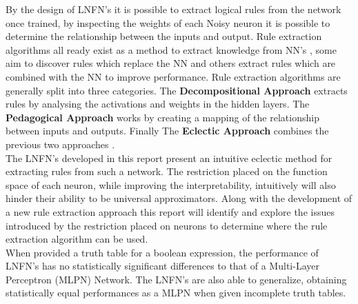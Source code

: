 By the design of LNFN's it is possible to extract logical rules from the network once trained, by inspecting the weights of each Noisy neuron it is possible to determine the relationship between the inputs and output. Rule extraction algorithms all ready exist as a method to extract knowledge from NN's \cite{andrews1995survey}, some aim to discover rules which replace the NN and others extract rules which are combined with the NN to improve performance. Rule extraction algorithms are generally split into three categories. The \textbf{Decompositional Approach} extracts rules by analysing the activations and weights in the hidden layers. The \textbf{Pedagogical Approach} works by creating a mapping of the relationship between inputs and outputs. Finally The \textbf{Eclectic Approach} combines the previous two approaches \cite{andrews1995survey}.\\

The LNFN's developed in this report present an intuitive eclectic method for extracting rules from such a network. The restriction placed on the function space of each neuron, while improving the interpretability, intuitively will also hinder their ability to be universal approximators. Along with the development of a new rule extraction approach this report will identify and explore the issues introduced by the restriction placed on neurons to determine where the rule extraction algorithm can be used.\\

When provided a truth table for a boolean expression, the performance of LNFN's has no statistically significant differences to that of a Multi-Layer Perceptron (MLPN) Network. The LNFN's are also able to generalize, obtaining statistically equal performances as a MLPN when given incomplete truth tables.\\

